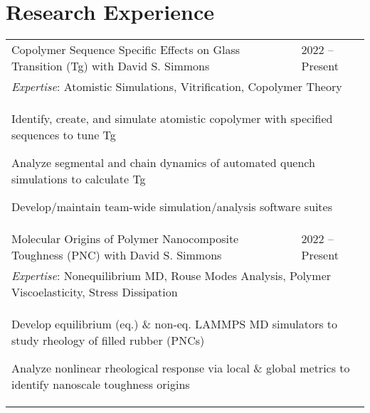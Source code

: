 \documentclass[letterpaper,11pt]{article}
\begin{document}

\vspace{-0.3cm}
\section*{Research Experience}
\bgroup
\setlength\extrarowheight{-12pt}
\def\arraystretch{0.5}
\begin{tabular}{@{}p{}l@{}}
  Copolymer Sequence Specific Effects on Glass Transition (Tg) with David S. Simmons & 2022 -- Present \\
  \multicolumn{2}{p{\textwidth}}{\textit{Expertise}: Atomistic Simulations, Vitrification, Copolymer Theory} \\
  \multicolumn{2}{p{\textwidth}}{
    \begin{tabitemize} 
      \item Identify, create, and simulate atomistic copolymer with specified sequences to tune Tg
      \item Analyze segmental and chain dynamics of automated quench simulations to calculate Tg
      \item Develop/maintain team-wide simulation/analysis software suites
    \end{tabitemize}
  } \\ 

  Molecular Origins of Polymer Nanocomposite Toughness (PNC) with David S. Simmons & 2022 -- Present \\
  \multicolumn{2}{p{\textwidth}}{\textit{Expertise}: Nonequilibrium MD, Rouse Modes Analysis, Polymer Viscoelasticity, Stress Dissipation} \\
  \multicolumn{2}{p{\textwidth}}{
    \begin{tabitemize} 
      \item Develop equilibrium (eq.) \& non-eq. LAMMPS MD simulators to study rheology of filled rubber (PNCs)
      \item Analyze nonlinear rheological response via local \& global metrics to identify nanoscale toughness origins
    \end{tabitemize}
  }  \\ 


\end{tabular}
\end{document}
